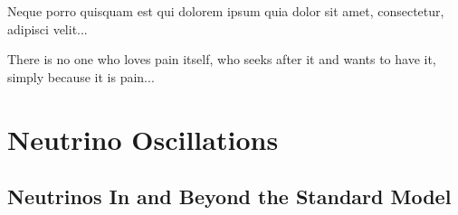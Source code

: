 \begin{savequote}[8cm]
\textlatin{Neque porro quisquam est qui dolorem ipsum quia dolor sit amet, consectetur, adipisci velit...}

There is no one who loves pain itself, who seeks after it and wants to have it, simply because it is pain...
\end{savequote}

\chapter{\label{ch:neutrino_oscillations}Neutrino Oscillations} 

\minitoc

\section{Neutrinos In and Beyond the Standard Model}

